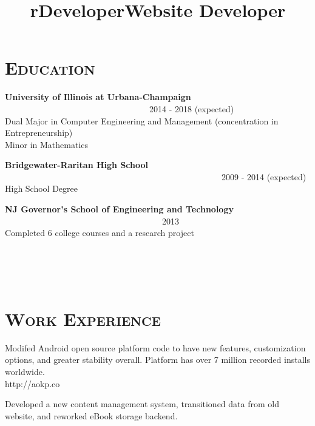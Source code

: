 \begin{resume}

\section{\textsc{Education}}

\textbf{University of Illinois at Urbana-Champaign} \ \ \ \ \ \ \ \ \ \ \ \ \ \ \ \ \ \ \ \ \ \ \ \ \ \ \ \ \ \ \ \ \ \ 2014 - 2018 (expected) \\
Dual Major in Computer Engineering and Management (concentration in Entrepreneurship) \\ Minor in Mathematics

\textbf{Bridgewater-Raritan High School} \ \ \ \ \ \ \ \ \ \ \ \ \ \ \ \ \ \ \ \ \ \ \ \ \ \ \ \ \ \ \ \ \ \ \ \ \ \ \ \ \ \ \ \ \ \ \ \ \ \ \ 2009 - 2014 (expected)\\
High School Degree

\textbf{NJ Governor's School of Engineering and Technology} \ \ \ \ \ \ \ \ \ \ \ \ \ \ \ \ \ \ \ \ \ \ \ \ \ \ \ \ \ \ \ \ \ \ \ \ \ 2013 \\ 
Completed 6 college courses and a research project

\begin{formatb}
  \title{r}\\
  \\
  \body\\
\end{formatb}

\section{\textsc{Work Experience}}

\title{Developer}
\begin{position}
Modifed Android open source platform code to have new features, customization options, and greater stability overall. Platform has over 7 million recorded installs worldwide. \\ http://aokp.co
\end{position}

\title{Website Developer}
\begin{position}
Developed a new content management system, transitioned data from old website, and reworked eBook storage backend.
\end{position}


\end{resume}
